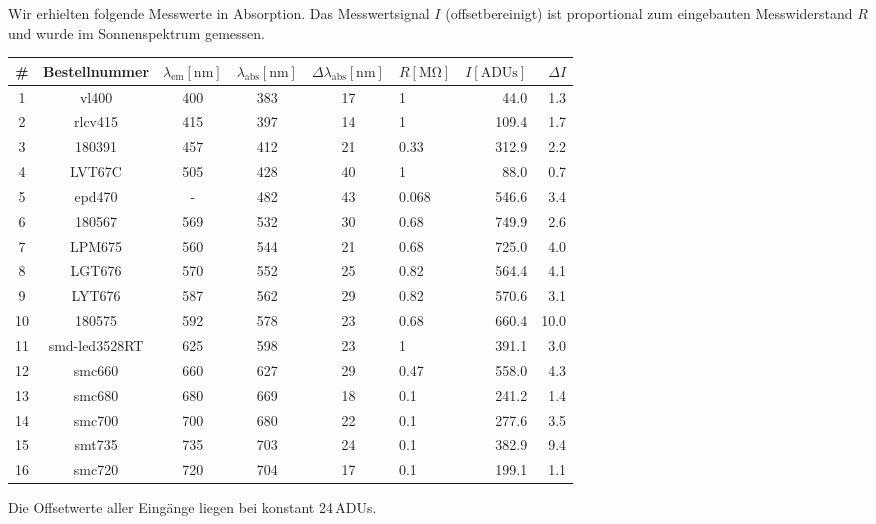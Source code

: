 \documentclass[a4paper, 12pt]{scrartcl}
\begin{document}
Wir erhielten folgende Messwerte in Absorption.
Das Messwertsignal $I$ (offsetbereinigt) ist proportional zum eingebauten Messwiderstand $R$ und wurde im Sonnenspektrum gemessen.

{\centering
\begin{tabular}{c|c|c|c|c|l|r|r}
\# &
Bestellnummer &
$\lambda_\text{em} [\mathrm{nm}]$ &
$\lambda_\text{abs} [\mathrm{nm}]$ &
$\Delta\lambda_\text{abs} [\mathrm{nm}]$ &
$R [\mathrm{M\Omega}]$ &
$I [\text{ADUs}]$ &
$\Delta I$\\
\hline
1 & vl400 & 400 & 383 & 17 & 1 & 44.0 & 1.3\\
2 & rlcv415 & 415 & 397 & 14 & 1 & 109.4 & 1.7\\
3 & 180391 & 457 & 412 & 21 & 0.33 & 312.9 & 2.2\\
4 & LVT67C & 505 & 428 & 40 & 1 & 88.0 & 0.7\\
5 & epd470 & - & 482 & 43 & 0.068 & 546.6 & 3.4\\
6 & 180567 & 569 & 532 & 30 & 0.68 & 749.9 & 2.6\\
7 & LPM675 & 560 & 544 & 21 & 0.68 & 725.0 & 4.0\\
8 & LGT676 & 570 & 552 & 25 & 0.82 & 564.4 & 4.1\\
9 & LYT676 & 587 & 562 & 29 & 0.82 & 570.6 & 3.1\\
10 & 180575 & 592 & 578 & 23 & 0.68 & 660.4 & 10.0\\
11 & smd-led3528RT & 625 & 598 & 23 & 1 & 391.1 & 3.0\\
12 & smc660 & 660 & 627 & 29 & 0.47 & 558.0 & 4.3\\
13 & smc680 & 680 & 669 & 18 & 0.1 & 241.2 & 1.4\\
14 & smc700 & 700 & 680 & 22 & 0.1 & 277.6 & 3.5\\
15 & smt735 & 735 & 703 & 24 & 0.1 & 382.9 & 9.4\\
16 & smc720 & 720 & 704 & 17 & 0.1 & 199.1 & 1.1\\
\end{tabular}}

Die Offsetwerte aller Eingänge liegen bei konstant 24\,ADUs.
\end{document}

